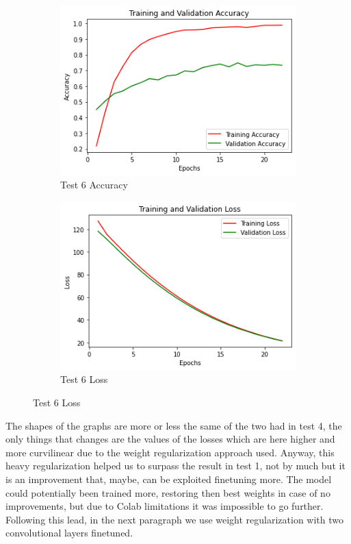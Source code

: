 \begin{figure}[H]
	\begin{subfigure}{0.5\textwidth}
		\includegraphics[width=0.9\linewidth]{img/vgg16/vgg16ft1dropregacc.png} 
		\caption{Test 6 Accuracy}
		\label{fig:vgg16ft1dropregacc}
	\end{subfigure}
	\begin{subfigure}{0.5\textwidth}
		\includegraphics[width=0.9\linewidth]{img/vgg16/vgg16ft1dropregloss.png}
		\caption{Test 6 Loss}
		\label{fig:vgg16ft1dropregloss}
	\end{subfigure}
\end{figure}

The shapes of the graphs are more or less the same of the two had in test 4, the only things that changes are the values of the losses which are here higher and more curvilinear due to the weight regularization approach used. Anyway, this heavy regularization helped us to surpass the result in test 1, not by much but it is an improvement that, maybe, can be exploited finetuning more. The model could potentially been trained more, restoring then best weights in case of no improvements, but due to Colab limitations it was impossible to go further. Following this lead, in the next paragraph we use weight regularization with two convolutional layers finetuned.






